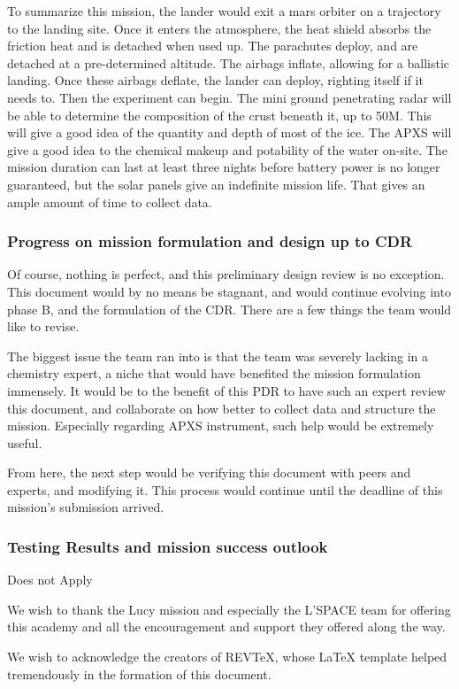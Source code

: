 \documentclass[%
 portrait,
 aapm,
 mph,%
 amsmath,amssymb,
 reprint,%
]{revtex4-2}
\begin{document}
To summarize this mission, the lander would exit a mars orbiter on a trajectory to the landing site. Once it enters the atmosphere, the heat shield absorbs the friction heat and is detached when used up. The parachutes deploy, and are detached at a pre-determined altitude. The airbags inflate, allowing for a ballistic landing. Once these airbags deflate, the lander can deploy, righting itself if it needs to. Then the experiment can begin. The mini ground penetrating radar will be able to determine the composition of the crust beneath it, up to 50M. This will give a good idea of the quantity and depth of most of the ice. The APXS will give a good idea to the chemical makeup and potability of the water on-site. The mission duration can last at least three nights before battery power is no longer guaranteed, but the solar panels give an indefinite mission life. That gives an ample amount of time to collect data. 

\subsubsection{Progress on mission formulation and design up to CDR}
Of course, nothing is perfect, and this preliminary design review is no exception. This document would by no means be stagnant, and would continue evolving into phase B, and the formulation of the CDR. There are a few things the team would like to revise. 

The biggest issue the team ran into is that the team was severely lacking in a chemistry expert, a niche that would have benefited the mission formulation immensely. It would be to the benefit of this PDR to have such an expert review this document, and collaborate on how better to collect data and structure the mission. Especially regarding APXS instrument, such help would be extremely useful.

From here, the next step would be verifying this document with peers and experts, and modifying it. This process would continue until the deadline of this mission's submission arrived.

\subsubsection{Testing Results and mission success outlook}
Does not Apply

\begin{acknowledgments}
We wish to thank the Lucy mission and especially the L'SPACE team for offering this academy and all the encouragement and support they offered along the way. 

We wish to acknowledge the creators of REV\TeX{}, whose \LaTeX{} template helped tremendously in the formation of this document. 
\end{acknowledgments}
\end{document}
